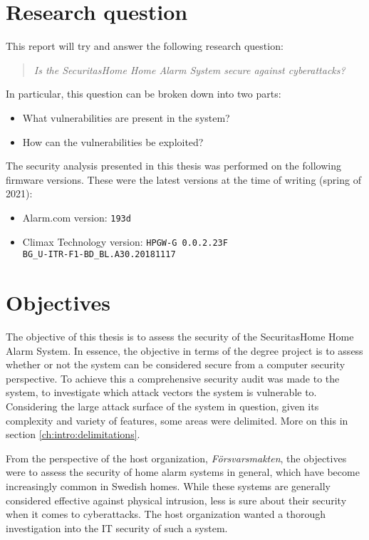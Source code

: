 \section{Research question} \label{ch:intro:research-question}
This report will try and answer the following research question:

\begin{quote}
    \textit{Is the SecuritasHome Home Alarm System secure against cyberattacks?}
\end{quote}

In particular, this question can be broken down into two parts:

\begin{itemize}
    \item What vulnerabilities are present in the system?
    \item How can the vulnerabilities be exploited?
\end{itemize}

The security analysis presented in this thesis was performed on the following firmware versions. These were the latest versions at the time of writing (spring of 2021):
\begin{itemize}
    \item Alarm.com version: \texttt{193d}
    \item Climax Technology version: \texttt{HPGW-G 0.0.2.23F\\ BG\_U-ITR-F1-BD\_BL.A30.20181117}
\end{itemize}

\section{Objectives} \label{ch:intro:objectives}
The objective of this thesis is to assess the security of the SecuritasHome Home Alarm System. In essence, the objective in terms of the degree project is to assess whether or not the system can be considered secure from a computer security perspective. To achieve this a comprehensive security audit was made to the system, to investigate which attack vectors the system is vulnerable to. Considering the large attack surface of the system in question, given its complexity and variety of features, some areas were delimited. More on this in section \ref{ch:intro:delimitations}.

From the perspective of the host organization, \textit{Försvarsmakten}, the objectives were to assess the security of home alarm systems in general, which have become increasingly common in Swedish homes. While these systems are generally considered effective against physical intrusion, less is sure about their security when it comes to cyberattacks. The host organization wanted a thorough investigation into the IT security of such a system.

